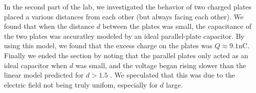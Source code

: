 \documentclass[oneside,12pt]{amsart}
\begin{document}
	 \indent In the second part of the lab, we investigated the behavior of two charged plates placed a various distances from each other (but always facing each other). We found that when the distance $d$ between the plates was small, the capacitance of the two plates was accuratley modeled by an ideal parallel-plate capacitor. By using this model, we found that the excess charge on the plates was $Q\approx 9.1$nC. Finally we ended the section by noting that the parallel plates only acted as an ideal capacitor when $d$ was small, and the voltage began rising slower than the linear model predicted for $d>1.5$ . We speculated that this was due to the electric field not being truly unifom, especially for $d$ large.
	
\newpage
\printbibliography
	 
	
\end{document}
